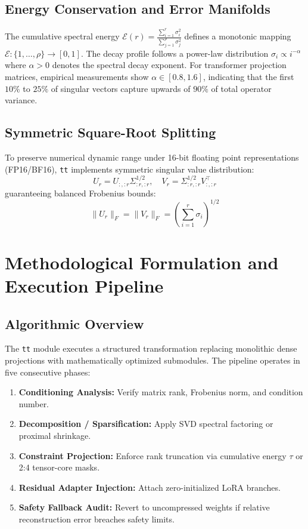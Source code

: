 \subsection{Energy Conservation and Error Manifolds}
The cumulative spectral energy $\mathcal{E}(r) = \frac{\sum_{i=1}^r \sigma_i^2}{\sum_{j=1}^\rho \sigma_j^2}$ defines a monotonic mapping $\mathcal{E}: \{1, \dots, \rho\} \to [0, 1]$. The decay profile follows a power-law distribution $\sigma_i \propto i^{-\alpha}$ where $\alpha > 0$ denotes the spectral decay exponent. For transformer projection matrices, empirical measurements show $\alpha \in [0.8, 1.6]$, indicating that the first $10\%$ to $25\%$ of singular vectors capture upwards of $90\%$ of total operator variance.

\subsection{Symmetric Square-Root Splitting}
To preserve numerical dynamic range under 16-bit floating point representations (FP16/BF16), \texttt{tt} implements symmetric singular value distribution:
\[
U_r = U_{:, :r} \Sigma_{:r, :r}^{1/2}, \quad V_r = \Sigma_{:r, :r}^{1/2} V_{:, :r}^\top
\]
guaranteeing balanced Frobenius bounds:
\[
\|U_r\|_F = \|V_r\|_F = \left( \sum_{i=1}^{r} \sigma_i \right)^{1/2}
\]


\section{Methodological Formulation and Execution Pipeline}

\subsection{Algorithmic Overview}
The \texttt{tt} module executes a structured transformation replacing monolithic dense projections with mathematically optimized submodules. The pipeline operates in five consecutive phases:
\begin{enumerate}
\item \textbf{Conditioning Analysis:} Verify matrix rank, Frobenius norm, and condition number.
\item \textbf{Decomposition / Sparsification:} Apply SVD spectral factoring or proximal shrinkage.
\item \textbf{Constraint Projection:} Enforce rank truncation via cumulative energy $\tau$ or 2:4 tensor-core masks.
\item \textbf{Residual Adapter Injection:} Attach zero-initialized LoRA branches.
\item \textbf{Safety Fallback Audit:} Revert to uncompressed weights if relative reconstruction error breaches safety limits.
\end{enumerate}

